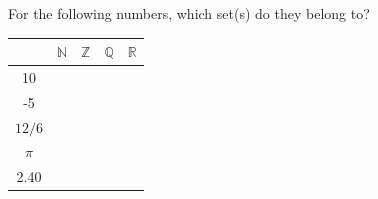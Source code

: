 \documentclass[a4paper,12pt]{book}
\newcounter{question}
\begin{document}
        \begin{questionNOGRADE}{\thequestion}

            For the following numbers, which set(s) do they belong to?

            \begin{center}
                \begin{tabular}{| c | c | c | c | c |}
                    \hline
                    & $\mathbb{N}$ & $\mathbb{Z}$ & $\mathbb{Q}$ & $\mathbb{R}$
                    \\ \hline
                    10 & \solution{\checkmark}{} & \solution{\checkmark}{} & \solution{\checkmark}{} & \solution{\checkmark}{}
                    \\ \hline
                    -5 & \solution{}{} & \solution{\checkmark}{} & \solution{\checkmark}{} & \solution{\checkmark}{}
                    \\ \hline
                    $12/6$ & \solution{\checkmark}{} & \solution{\checkmark}{} & \solution{\checkmark}{} & \solution{\checkmark}{}
                    \\ \hline
                    $\pi$ & \solution{}{} & \solution{}{} & \solution{}{} & \solution{\checkmark}{}
                    \\ \hline
                    2.40 & \solution{}{} & \solution{}{} & \solution{\checkmark}{} & \solution{\checkmark}{}
                    \\ \hline
                \end{tabular}
            \end{center}

        \end{questionNOGRADE}
\end{document}
